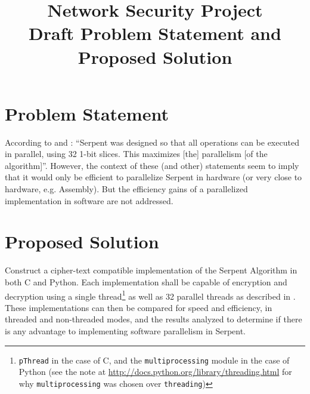 \documentclass{article}
\title{Network Security Project\\Draft Problem Statement and Proposed Solution}
\begin{document}
\maketitle

\section{Problem Statement}

According to and \cite{wikipedia}: \enquote{Serpent was designed so that all operations can be executed in parallel, using 32 1-bit slices. This maximizes [the] parallelism [of the algorithm]}. However, the context of these (and other) statements seem to imply that it would only be efficient to parallelize Serpent in hardware (or very close to hardware, e.g. Assembly). But the efficiency gains of a parallelized implementation in software are not addressed.

\section{Proposed Solution}

Construct a cipher-text compatible implementation of the Serpent Algorithm in both C and Python. Each implementation shall be capable of encryption and decryption using a single thread\footnote{\texttt{pThread} in the case of C, and the \texttt{multiprocessing} module in the case of Python (see the note at \url{http://docs.python.org/library/threading.html} for why \texttt{multiprocessing} was chosen over \texttt{threading})} as well as 32 parallel threads as described in \cite{submission}. These implementations can then be compared for speed and efficiency, in threaded and non-threaded modes, and the results analyzed to determine if there is any advantage to implementing software parallelism in Serpent.

\printbibliography
\end{document}

